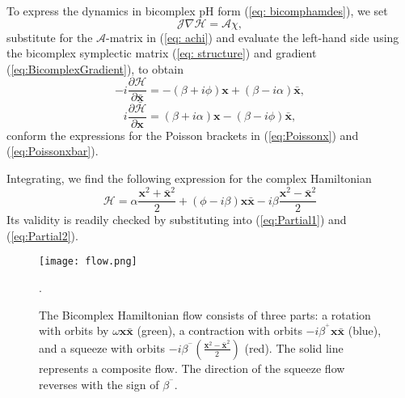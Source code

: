 \documentclass{article}
\begin{document}
To express the dynamics in bicomplex pH form (\ref{eq: bicomphamdes}), we set
$$ \mathcal{J}\nabla \mathcal{H}=\mathcal{A}\chi ,
$$
 substitute for the $\mathcal{A}$-matrix in (\ref{eq: achi}) and  evaluate the left-hand side using the bicomplex symplectic matrix (\ref{eq: structure}) and gradient (\ref{eq:BicomplexGradient}), to obtain
\begin{equation}
\label{eq:Partial1}
      -i\frac{\partial \mathcal{H}}{\partial \bar{\textbf{x}}} =  -(\beta+i\phi)\textbf{x} +(\beta-i\alpha)\bar{\textbf{x}},
\end{equation}
\begin{equation}
\label{eq:Partial2}
  i\frac{\partial \bar{\mathcal{H}}}{\partial {\textbf{x}}} =  (\beta+i\alpha)\textbf{x} -(\beta-i\phi)\bar{\textbf{x}},
\end{equation}
conform the expressions for the Poisson brackets in (\ref{eq:Poissonx}) and (\ref{eq:Poissonxbar}).  

Integrating, we find the following expression for the complex Hamiltonian
\begin{equation}
\label{eq: cham}
   \mathcal{H} = \alpha \frac{\textbf{x}^2 +\bar{\textbf{x}}^2}{2}
    +(\phi-i\beta)\textbf{x}\bar{\textbf{x}}-{i{\beta}\frac{\textbf{x}^2-\bar{\textbf{x}}^2}{2}}
\end{equation}
Its validity is readily checked by substituting into (\ref{eq:Partial1}) and (\ref{eq:Partial2}).


\begin{figure}
    \centering
    \texttt{[image: flow.png]}
    \caption{{\small The Bicomplex Hamiltonian flow consists of three parts: a rotation with orbits by $\omega\textbf{x}\bar{\textbf{x}}$ (green), a contraction with orbits $-i\beta^{{}^+}\textbf{x}\bar{\textbf{x}}$ (blue), and a squeeze with orbits $-i\beta^{{}^-} (\frac{\textbf{x}^2-\bar{\textbf{x}}^2}{2})$ (red). The solid line represents a composite flow. The direction of the squeeze flow reverses with the sign of $\beta^{{}^-}$.}}.  
   \label{fig: vec}
\end{figure}
\end{document}
